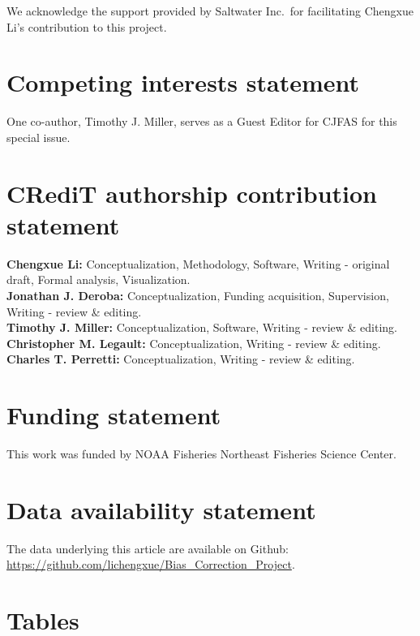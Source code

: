 \documentclass[
  12pt,
]{article}
\begin{document}
We acknowledge the support provided by Saltwater Inc.~for facilitating
Chengxue Li's contribution to this project.

\section{Competing interests
statement}\label{competing-interests-statement}

One co-author, Timothy J. Miller, serves as a Guest Editor for CJFAS for
this special issue.

\section{CRediT authorship contribution
statement}\label{credit-authorship-contribution-statement}

\textbf{Chengxue Li:} Conceptualization, Methodology, Software, Writing
- original draft, Formal analysis, Visualization.\\
\textbf{Jonathan J. Deroba:} Conceptualization, Funding acquisition,
Supervision, Writing - review \& editing.\\
\textbf{Timothy J. Miller:} Conceptualization, Software, Writing -
review \& editing.\\
\textbf{Christopher M. Legault:} Conceptualization, Writing - review \&
editing.\\
\textbf{Charles T. Perretti:} Conceptualization, Writing - review \&
editing.

\section{Funding statement}\label{funding-statement}

This work was funded by NOAA Fisheries Northeast Fisheries Science
Center.

\section{Data availability statement}\label{data-availability-statement}

The data underlying this article are available on Github:
\url{https://github.com/lichengxue/Bias_Correction_Project}.

\section{Tables}\label{tables}


\end{document}
